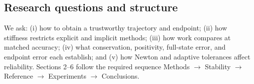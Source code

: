 \subsection{Research questions and structure}
We ask: (i) how to obtain a trustworthy trajectory and endpoint; (ii) how stiffness restricts explicit and implicit methods; (iii) how work compares at matched accuracy; (iv) what conservation, positivity, full-state error, and endpoint error each establish; and (v) how Newton and adaptive tolerances affect reliability. Sections 2--6 follow the required sequence Methods $\to$ Stability $\to$ Reference $\to$ Experiments $\to$ Conclusions.
